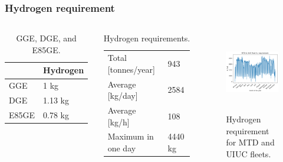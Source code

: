 \begin{frame}
\frametitle{Hydrogen requirement}
\begin{columns}
    \column[t]{5cm}
	\begin{table}[!htb]
		\centering
	    \caption{GGE, DGE, and E85GE.}
		\begin{tabular}{l|l}
		\hline
		                 & Hydrogen \\ \hline
		GGE              & 1 kg     \\
		DGE              & 1.13 kg  \\
		E85GE            & 0.78 kg  \\ \hline
        \end{tabular}
	\end{table}

	\begin{table}[!htb]
		\centering
	    \caption{Hydrogen requirements.}
		\begin{tabular}{l|l}
		\hline
		Total [tonnes/year]  & 943      \\
		Average [kg/day] 	 & 2584     \\
		Average [kg/h] 		 & 108      \\
		Maximum in one day   & 4440 kg  \\ \hline
        \end{tabular}
	\end{table}

	\column[t]{5cm}
	\begin{figure}[htbp!]
		\begin{center}
			\includegraphics[height=3.5cm]{images/hydro-fleet}
		\end{center}
		\caption{Hydrogen requirement for MTD and UIUC fleets.}
	\end{figure}

\end{columns}
\end{frame}


